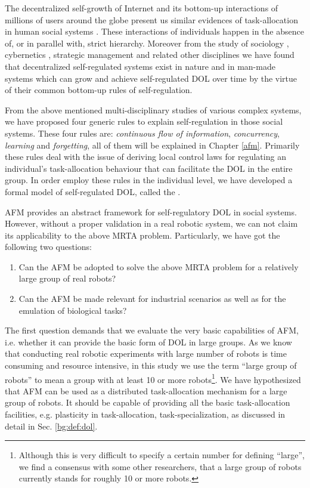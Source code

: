 The decentralized self-growth of Internet and its bottom-up interactions of millions of users around the globe present us similar evidences of task-allocation in human social systems \cite{Andriani+2004}. These interactions of individuals happen in the absence of, or in parallel with, strict hierarchy. Moreover from the study of sociology \cite{Sayer+1992}, cybernetics \cite{Beer1981}, strategic management \cite{Kogut2000} and related other disciplines we have found that decentralized self-regulated systems exist in nature and in man-made systems which can grow and achieve self-regulated DOL over time by the virtue of their common bottom-up rules of self-regulation.
 
From the above mentioned multi-disciplinary studies of various complex systems, we have proposed four generic rules to explain self-regulation in those social systems. These four rules are: \textit{continuous flow of information}, \textit{concurrency}, \textit{learning} and \textit{forgetting}, all of them will be explained in Chapter \ref{afm}. Primarily these rules deal with the issue of deriving local control laws for regulating an individual's task-allocation behaviour that can facilitate the DOL in the entire group. In order employ these rules in the individual level, we have developed a formal model of self-regulated DOL, called the .

AFM provides an abstract framework for self-regulatory DOL in social systems. However, without a proper validation in a real robotic system, we can not claim its applicability to the above MRTA problem. Particularly, we have got the following two questions:
\begin{enumerate}
\item Can the AFM be adopted to solve the above MRTA problem for a relatively large group of real robots?
\item Can the AFM be made relevant for industrial scenarios as well as for the emulation of biological tasks?
\end{enumerate}
The first question demands that we evaluate the very basic capabilities of AFM, i.e. whether it can provide the basic form of DOL in large groups. As we know that conducting real robotic experiments with large number of robots is time consuming and resource intensive, in this study we use the term ``large group of robots'' to mean a group with at least 10 or more robots\footnote{Although this is very difficult to specify a certain number for defining ``large'', we find a consensus with some other researchers, \protect{} that a large group of robots currently stands for roughly 10 or more robots.}. We have hypothesized that AFM can be used as a distributed task-allocation mechanism for a large group of robots. It should be capable of providing all the basic task-allocation facilities, e.g. plasticity in task-allocation, task-specialization, as discussed in detail in Sec. \ref{bg:def:dol}.

